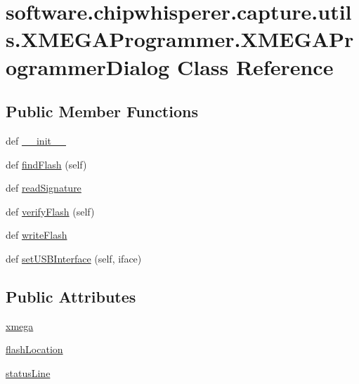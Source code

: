 \hypertarget{classsoftware_1_1chipwhisperer_1_1capture_1_1utils_1_1XMEGAProgrammer_1_1XMEGAProgrammerDialog}{}\section{software.\+chipwhisperer.\+capture.\+utils.\+X\+M\+E\+G\+A\+Programmer.\+X\+M\+E\+G\+A\+Programmer\+Dialog Class Reference}
\label{classsoftware_1_1chipwhisperer_1_1capture_1_1utils_1_1XMEGAProgrammer_1_1XMEGAProgrammerDialog}
\subsection*{Public Member Functions}
\begin{DoxyCompactItemize}
\item 
def \hyperlink{classsoftware_1_1chipwhisperer_1_1capture_1_1utils_1_1XMEGAProgrammer_1_1XMEGAProgrammerDialog_adb519b57e3d8449b5418e1e070aa06f9}{\+\_\+\+\_\+init\+\_\+\+\_\+}
\item 
def \hyperlink{classsoftware_1_1chipwhisperer_1_1capture_1_1utils_1_1XMEGAProgrammer_1_1XMEGAProgrammerDialog_a80830ebd5f64857a1e272d4423be8dbf}{find\+Flash} (self)
\item 
def \hyperlink{classsoftware_1_1chipwhisperer_1_1capture_1_1utils_1_1XMEGAProgrammer_1_1XMEGAProgrammerDialog_a44e9c93dde92824c90ca35e768a3df93}{read\+Signature}
\item 
def \hyperlink{classsoftware_1_1chipwhisperer_1_1capture_1_1utils_1_1XMEGAProgrammer_1_1XMEGAProgrammerDialog_a8a3aa82e780539611a4e4af44f2d5903}{verify\+Flash} (self)
\item 
def \hyperlink{classsoftware_1_1chipwhisperer_1_1capture_1_1utils_1_1XMEGAProgrammer_1_1XMEGAProgrammerDialog_aecff7f3f0abe19b911bcbdf0c2e787c2}{write\+Flash}
\item 
def \hyperlink{classsoftware_1_1chipwhisperer_1_1capture_1_1utils_1_1XMEGAProgrammer_1_1XMEGAProgrammerDialog_aeb3ebe25f74d69e590e18d8607baf97d}{set\+U\+S\+B\+Interface} (self, iface)
\end{DoxyCompactItemize}
\subsection*{Public Attributes}
\begin{DoxyCompactItemize}
\item 
\hyperlink{classsoftware_1_1chipwhisperer_1_1capture_1_1utils_1_1XMEGAProgrammer_1_1XMEGAProgrammerDialog_a7d77907b27fbf5c33fa1b65ffb844ebb}{xmega}
\item 
\hyperlink{classsoftware_1_1chipwhisperer_1_1capture_1_1utils_1_1XMEGAProgrammer_1_1XMEGAProgrammerDialog_ade2a4972c2c1ad75c75b75940936612f}{flash\+Location}
\item 
\hyperlink{classsoftware_1_1chipwhisperer_1_1capture_1_1utils_1_1XMEGAProgrammer_1_1XMEGAProgrammerDialog_a52f09c61f462d515059bf149cc7600be}{status\+Line}
\end{DoxyCompactItemize}


